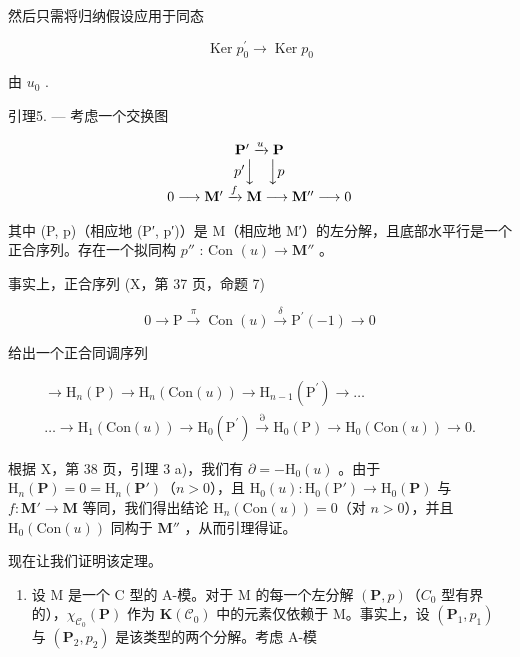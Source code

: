 然后只需将归纳假设应用于同态

\[
\operatorname{Ker} p _ {0} ^ {\prime} \rightarrow \operatorname{Ker} p _ {0}
\]

由 \(u_{0}\) .

引理5. --- 考虑一个交换图

\[
\begin{array}{c} \mathbf {P} ^ {\prime} \xrightarrow {u} \mathbf {P} \\ p ^ {\prime} \Big \downarrow \quad \Big \downarrow p \\ 0 \longrightarrow \mathbf {M} ^ {\prime} \xrightarrow {f} \mathbf {M} \longrightarrow \mathbf {M} ^ {\prime \prime} \longrightarrow 0 \end{array}
\]

其中 (P, p)（相应地 (P′, p′)）是 M（相应地 M′）的左分解，且底部水平行是一个正合序列。存在一个拟同构 \(p''\) : Con \((u) \to \mathbf{M}''\) 。

事实上，正合序列 (X，第 37 页，命题 7)

\[
0 \to \mathrm{P} \xrightarrow {\pi} \operatorname{Con} (u) \xrightarrow {\delta} \mathrm{P} ^ {\prime} (- 1) \to 0
\]

给出一个正合同调序列

\[
\begin{array}{c}\rightarrow \mathrm{H} _ {n} (\mathrm{P}) \rightarrow \mathrm{H} _ {n} (\mathrm{Con} (u)) \rightarrow \mathrm{H} _ {n - 1} (\mathrm{P} ^ {\prime}) \rightarrow \dots\\\dots \rightarrow \mathrm{H} _ {1} (\mathrm{Con} (u)) \rightarrow \mathrm{H} _ {0} (\mathrm{P} ^ {\prime}) \stackrel {{\partial}} {{\rightarrow}} \mathrm{H} _ {0} (\mathrm{P}) \rightarrow \mathrm{H} _ {0} (\mathrm{Con} (u)) \rightarrow 0.\end{array}
\]

根据 X，第 38 页，引理 3 a)，我们有 \(\partial = -\mathrm{H}_{0}(u)\) 。由于 \(\mathrm{H}_{n}(\mathbf{P}) = 0 = \mathrm{H}_{n}(\mathbf{P}')\)（\(n > 0\)），且 \(\mathrm{H}_{0}(u): \mathrm{H}_{0}(\mathrm{P}') \to \mathrm{H}_{0}(\mathbf{P})\) 与 \(f: \mathbf{M}' \to \mathbf{M}\) 等同，我们得出结论 \(\mathrm{H}_{n}(\mathrm{Con}(u)) = 0\)（对 \(n > 0\)），并且 \(\mathrm{H}_{0}(\mathrm{Con}(u))\) 同构于 \(\mathbf{M}''\) ，从而引理得证。

现在让我们证明该定理。

\begin{enumerate}
\def\labelenumi{\alph{enumi})}
\tightlist
\item
  设 M 是一个 C 型的 A-模。对于 M 的每一个左分解 \((\mathbf{P}, p)\)（\(C_{0}\) 型有界的），\(\chi_{\mathcal{C}_{0}}(\mathbf{P})\) 作为 \(\mathbf{K}(\mathcal{C}_{0})\) 中的元素仅依赖于 M。事实上，设 \((\mathbf{P}_{1}, p_{1})\) 与 \((\mathbf{P}_{2}, p_{2})\) 是该类型的两个分解。考虑 A-模
\end{enumerate}

